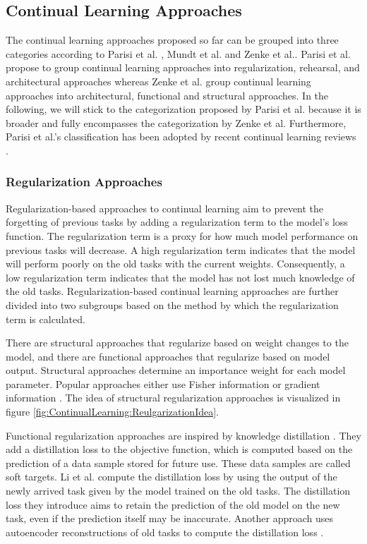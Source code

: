 \subsection{Continual Learning Approaches}
\label{sec:ContinualLearningApproaches}
The continual learning approaches proposed so far can be grouped into three categories according to Parisi et al. \cite{parisi2019continual}, Mundt et al. \cite{mundt2020wholistic}
and Zenke et al.\cite{zenke2017continual}. Parisi et al. \cite{parisi2019continual} propose to group continual learning approaches into regularization, rehearsal,
and architectural approaches whereas Zenke et al.
\cite{zenke2017continual} group continual learning approaches into architectural, functional and structural approaches. In the following, we will stick to the
categorization proposed by Parisi et al. because it is broader and fully encompasses the categorization by Zenke et al. Furthermore, Parisi et al.'s classification has been adopted by
recent continual learning reviews \cite{mundt2020wholistic}.

\subsubsection{Regularization Approaches}
\label{sec:RegularizationApproaches}
Regularization-based approaches to continual learning aim to prevent the forgetting of previous tasks by adding a regularization term to
the model's loss function. The regularization term is a proxy for how much model performance on previous tasks will decrease. A high
regularization term indicates that the model will perform poorly on the old tasks with the current weights. Consequently, a low regularization
term indicates that the model has not lost much knowledge of the old tasks. Regularization-based continual learning approaches are further
divided into two subgroups based on the method by which the regularization term is calculated. \par
There are structural approaches that regularize based on weight changes to the model, and there are functional
approaches that regularize based on model output. Structural approaches determine an importance weight for each
model parameter. Popular approaches either use Fisher information \parencite{kirkpatrick2017overcoming,lee2017overcoming} or
gradient information \parencite{aljundi2018memory,zenke2017continual}. The idea of structural regularization approaches is visualized in
figure \ref{fig:ContinualLearning:ReulgarizationIdea}. \par
Functional regularization approaches are inspired by knowledge distillation \cite{hinton2015distilling}. They add a distillation
loss to the objective function, which is computed based on the prediction of a data sample stored for future use. These data samples
are called soft targets. Li et al. \cite{li2017learning} compute the distillation loss by using the output of the newly arrived task
given by the model trained on the old tasks. The distillation loss they introduce aims to retain the prediction of the old model on
the new task, even if the prediction itself may be inaccurate. Another approach uses autoencoder reconstructions of old tasks to
compute the distillation loss \cite{rannen2017encoder}.


